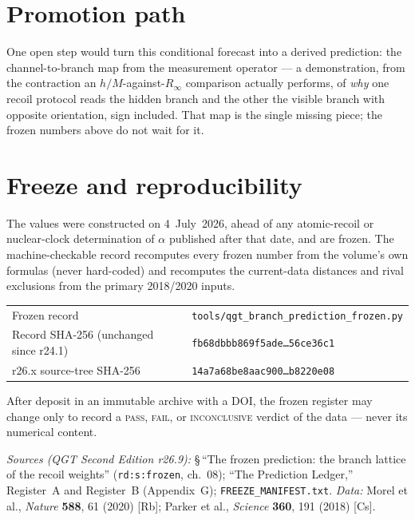 \documentclass[11pt]{article}
\begin{document}
\section*{Promotion path}

One open step would turn this conditional forecast into a derived prediction: the
channel-to-branch map from the measurement operator --- a demonstration, from the
contraction an $h/M$-against-$R_\infty$ comparison actually performs, of
\emph{why} one recoil protocol reads the hidden branch and the other the visible
branch with opposite orientation, sign included. That map is the single missing
piece; the frozen numbers above do not wait for it.

\section*{Freeze and reproducibility}

The values were constructed on 4~July~2026, ahead of any atomic-recoil or
nuclear-clock determination of $\alpha$ published after that date, and are frozen.
The machine-checkable record recomputes every frozen number from the volume's own
formulas (never hard-coded) and recomputes the current-data distances and rival
exclusions from the primary 2018/2020 inputs.

\begin{center}
\small
\begin{tabular}{ll}
\toprule
Frozen record & \texttt{tools/qgt\_branch\_prediction\_frozen.py}\\
Record SHA-256 (unchanged since r24.1) & \texttt{fb68dbbb869f5ade\ldots56ce36c1}\\
r26.x source-tree SHA-256 & \texttt{14a7a68be8aac900\ldots b8220e08}\\
\bottomrule
\end{tabular}
\end{center}

\noindent After deposit in an immutable archive with a DOI, the frozen register
may change only to record a \textsc{pass}, \textsc{fail}, or \textsc{inconclusive}
verdict of the data --- never its numerical content.

\bigskip
\footnotesize\sloppy
\noindent\textit{Sources (QGT Second Edition r26.9):} \S\,``The frozen
prediction: the branch lattice of the recoil weights'' (\texttt{rd:s:frozen},
ch.~08); ``The Prediction Ledger,'' Register~A and Register~B (Appendix~G);
\texttt{FREEZE\_MANIFEST.txt}. \textit{Data:} Morel et al., \textit{Nature}
\textbf{588}, 61 (2020) [Rb]; Parker et al., \textit{Science} \textbf{360}, 191
(2018) [Cs].
\end{document}
